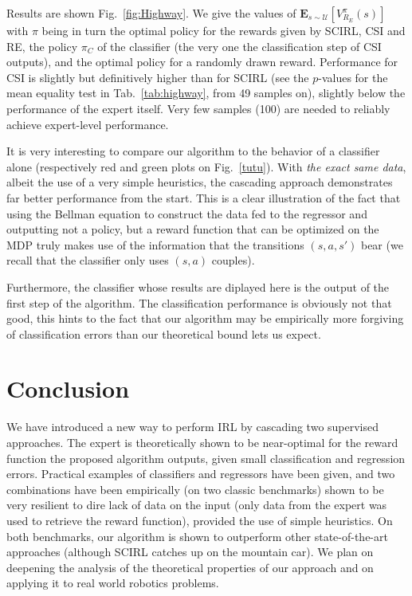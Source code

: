 \documentclass{llncs}
\begin{document}
Results are shown Fig.~\ref{fig:Highway}. We give the values of $\mathbf{E}_{s\sim\mathcal{U}}[V^{\pi}_{R_E}(s)]$ with $\pi$ being in turn the optimal policy for the rewards given by SCIRL, CSI and RE, the policy $\pi_C$ of the classifier (the very one the classification step of CSI outputs), and the optimal policy for a randomly drawn reward. Performance for CSI is slightly but definitively higher than for SCIRL (see the $p$-values for the mean equality test in Tab.~\ref{tab:highway}, from 49 samples on), slightly below the performance of the expert itself. Very few samples (100) are needed to reliably achieve expert-level performance.

It is very interesting to compare our algorithm to the behavior of a classifier alone (respectively red and green plots on Fig.~\ref{tutu}). With \emph{the exact same data}, albeit the use of a very simple heuristics, the cascading approach demonstrates far better performance from the start. This is a clear illustration of the fact that using the Bellman equation to construct the data fed to the regressor and outputting not a policy, but a reward function that can be optimized on the MDP truly makes use of the information that the transitions $(s,a,s')$ bear (we recall that the classifier only uses $(s,a)$ couples).

Furthermore, the classifier whose results are diplayed here is the output of the first step of the algorithm. The classification performance is obviously not that good, this hints to the fact that our algorithm may be empirically more forgiving of classification errors than our theoretical bound lets us expect.

\section{Conclusion}
\label{sec:conclusion}
We have introduced a new way to perform IRL by cascading two supervised approaches. The expert is theoretically shown to be near-optimal for the reward function the proposed algorithm outputs, given small classification and regression errors. Practical examples of classifiers and regressors have been given, and two combinations have been empirically (on two classic benchmarks) shown to be very resilient to dire lack of data on the input (only data from the expert was used to retrieve the reward function), provided the use of simple heuristics. On both benchmarks, our algorithm is shown to outperform other state-of-the-art approaches (although SCIRL catches up on the mountain car). We plan on deepening the analysis of the theoretical properties of our approach and on applying it to real world robotics problems.



\end{document}
